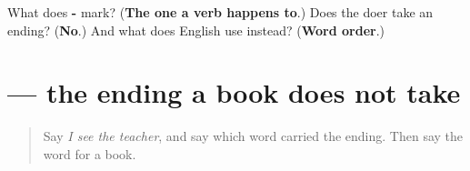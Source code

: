 \begin{tcolorbox}[breakable,colback=teal!4,colframe=teal!35!black,title={Before you move on}]
What does \textbf{-} mark? (\textbf{The one a verb happens to}.) Does the doer take an ending? (\textbf{No}.) And what does English use instead? (\textbf{Word order}.)
\end{tcolorbox}
\section[\texorpdfstring{\ml{പുസ്തകം} \ml{വായിക്കുന്നു} (pustakaṁ vāyikkunnu)}{പുസ്തകം വായിക്കുന്നു (pustakaṁ vāyikkunnu)}]{  — the ending a book does not take}

\label{lesson:ML-C87-animacy}



\begin{quote}
Say \emph{I see the teacher}, and say which word carried the ending. Then say the word for a book.
\end{quote}

